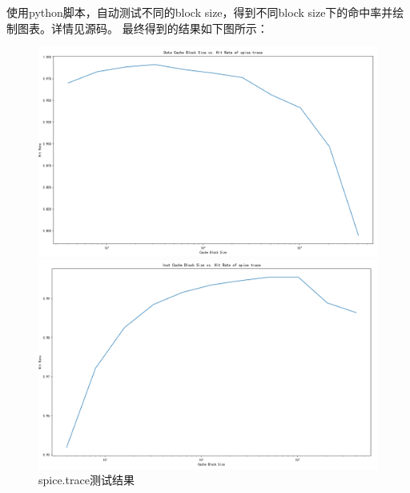 \documentclass[12pt,hyperref,a4paper,UTF8]{ctexart}
\begin{document}
使用python脚本，自动测试不同的block size，得到不同block size下的命中率并绘制图表。详情见源码。
最终得到的结果如下图所示：


\begin{figure}[H]
    \centering
    \begin{minipage}[b]{0.45\textwidth}
        \centering
        \includegraphics[width=\textwidth]{./figures/fig/image21.png}
    \end{minipage}
    \hfill
    \begin{minipage}[b]{0.45\textwidth}
        \centering
        \includegraphics[width=\textwidth]{./figures/fig/image22.png}
    \end{minipage}
    \caption{spice.trace测试结果}
\end{figure}
\end{document}
